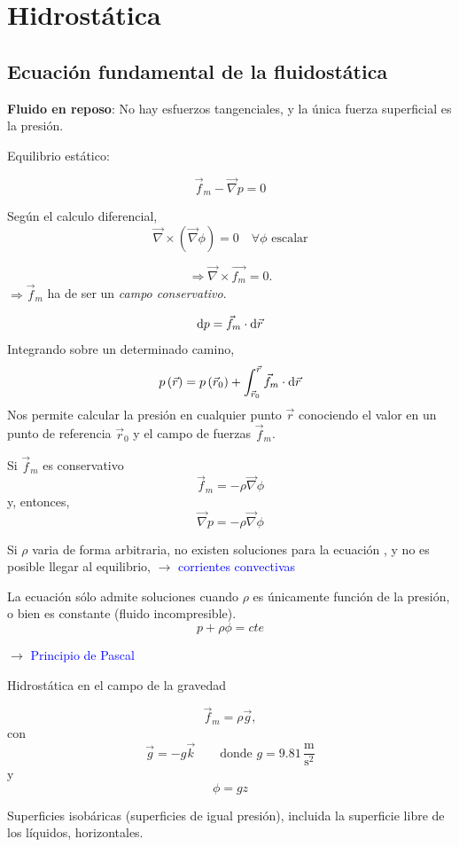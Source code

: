 \chapter{Hidrostática}

\section{Ecuación fundamental de la fluidostática}

\textbf{Fluido en reposo}: No hay esfuerzos tangenciales, y la única
fuerza superficial es la presión.

Equilibrio estático: 

\begin{equation}
\vec{f}_{m}-\vec{\nabla}p=0
\end{equation}


Según el calculo diferencial, 
\[
\vec{\nabla}\times\left(\vec{\nabla}\phi\right)=0\quad\forall\phi\text{ escalar}
\]

\[
\Rightarrow\vec{\nabla}\times\vec{f_{m}}=0.
\]
 $\Rightarrow\vec{f}_{m}$ ha de ser un \emph{campo conservativo}.

\[
\text{d} p=\vec{f}_{m}\cdot\text{d}\vec{r}
\]
 Integrando sobre un determinado camino, 
\[
p\left(\vec{r}\right)=p\left(\vec{r}_{0}\right)+\int_{\vec{r}_{0}}^{\vec{r}}\vec{f}_{m}\cdot\text{d}\vec{r}
\]
 Nos permite calcular la presión en cualquier punto $\vec{r}$ conociendo
el valor en un punto de referencia $\vec{r}_{0}$ y el campo de fuerzas
$\vec{f}_{m}$.

Si $\vec{f}_{m}$ es conservativo 
\[
\vec{f}_{m}=-\rho\vec{\nabla}\phi
\]
 y, entonces, 
\[
\vec{\nabla}p=-\rho\vec{\nabla}\phi
\]

Si $\rho$ varia de forma arbitraria, no existen soluciones para la
ecuación , y no es posible llegar al equilibrio, $\rightarrow$ \textcolor{blue}{corrientes
convectivas}

La ecuación sólo admite soluciones cuando $\rho$ es únicamente función
de la presión, o bien es constante (fluido incompresible). 
\[
p+\rho \phi=cte
\]

$\rightarrow$ \textcolor{blue}{Principio de Pascal}

Hidrostática en el campo de la gravedad

\[
\vec{f}_{m}=\rho\vec{g},
\]
 con 
\[
\vec{g}=-g\vec{k}\qquad\text{donde }g=9.81\,\frac{\textrm{m}}{\textrm{s}^{2}}
\]
 y 
\[
\phi=gz
\]

Superficies isobáricas (superficies de igual presión), incluida la
superficie libre de los líquidos, horizontales. %

